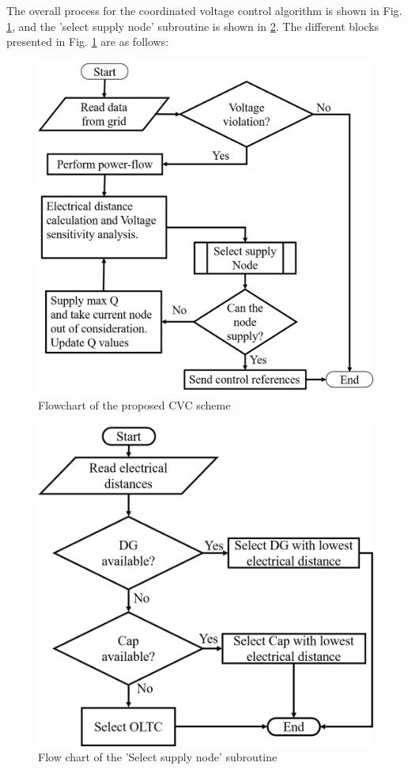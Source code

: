 The overall process for the coordinated voltage control algorithm is shown in Fig. \ref{fig:Overview}, and the 'select supply node' subroutine is shown in \ref{fig:sub_rou}. The different blocks presented in Fig. \ref{fig:Overview} are as follows:

\begin{figure}[!h]
\centering
\includegraphics[width=0.8\linewidth]{figs/CVC_FLOWCHART_NEW.png}
\caption{Flowchart of the proposed CVC scheme}
\label{fig:Overview}
\end{figure}

\begin{figure}[!h]
\centering
\includegraphics[width=0.8\linewidth]{figs/Flow_chart_2_1.png}
\caption{Flow chart of the 'Select supply node' subroutine}
\label{fig:sub_rou}
\end{figure}

